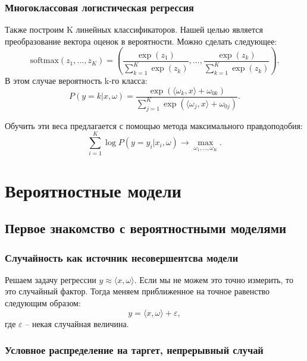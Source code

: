 \documentclass[a4paper, 10pt, openany]{book} %
\begin{document}
	\subsection{Многоклассовая логистическая регрессия}
	
	Также построим K линейных классификаторов. Нашей целью является преобразование вектора оценок в вероятности. Можно сделать следующее:
	\begin{equation*}
	    \text{softmax}(z_1,...,z_K) = \left(\frac{\exp(z_1)}{\sum_{k=1}^{K}\exp(z_k)},...,\frac{\exp(z_k)}{\sum_{k=1}^{K}\exp(z_k)}\right).
	\end{equation*}
	В этом случае вероятность k-го класса:
	\begin{equation*}
	    P(y=k|x,\omega) = \frac{\exp(\langle\omega_k,x\rangle + \omega_{0k})}{\sum_{j=1}^{K}\exp(\langle\omega_j,x\rangle + \omega_{0j})}.
	\end{equation*}
	
	Обучить эти веса предлагается с помощью метода максимального правдоподобия:
	\begin{equation*}
	    \sum_{i=1}^{K}\log P(y=y_i|x_i, \omega) \rightarrow \max_{\omega_1,...,\omega_K}.
	\end{equation*}
	
	\chapter{Вероятностные модели}
	
	\section{Первое знакомство с вероятностными моделями}
	
	\subsection{Случайность как источник несовершентсва модели}
	
	Решаем задачу регрессии $y \approx \langle x, \omega \rangle$. Если мы не можем это точно измерить, то это случайный фактор. Тогда меняем приближенное на точное равенство следующим образом:
	\begin{equation*}
	    y = \langle x, \omega \rangle + \varepsilon,
	\end{equation*}
	где $\varepsilon$ -- некая случайная величина.
	
	\subsection{Условное распределение на таргет, непрерывный случай}
	
\end{document}
